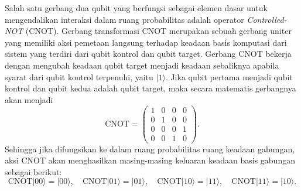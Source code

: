 Salah satu gerbang dua qubit yang berfungsi sebagai elemen dasar untuk mengendalikan interaksi dalam ruang probabilitas adalah operator \textit{Controlled-NOT} (CNOT). Gerbang transformasi CNOT merupakan sebuah gerbang uniter yang memiliki aksi pemetaan langsung terhadap keadaan basis komputasi dari sistem yang terdiri dari qubit kontrol dan qubit target. Gerbang CNOT bekerja dengan mengubah keadaan qubit target menjadi keadaan sebaliknya apabila syarat dari qubit kontrol terpenuhi, yaitu $|1\rangle$. Jika qubit pertama menjadi qubit kontrol dan qubit kedua adalah qubit target, maka secara matematis gerbangnya akan menjadi
\begin{equation}
    \label{eq:cnot_action_matrix}
    \text{CNOT} = \begin{pmatrix}
        1 & 0 & 0 & 0 \\
        0 & 1 & 0 & 0 \\
        0 & 0 & 0 & 1 \\
        0 & 0 & 1 & 0
    \end{pmatrix}.
\end{equation}
Sehingga jika difungsikan ke dalam ruang probabilitas ruang keadaan gabungan, aksi
CNOT akan menghasilkan masing-masing keluaran keadaan basis gabungan sebagai berikut:
\begin{equation}
    \label{eq:cnot_action_basis}
        \text{CNOT}|00\rangle = |00\rangle, \quad
        \text{CNOT}|01\rangle = |01\rangle, \quad
        \text{CNOT}|10\rangle = |11\rangle, \quad
        \text{CNOT}|11\rangle = |10\rangle.
\end{equation}

